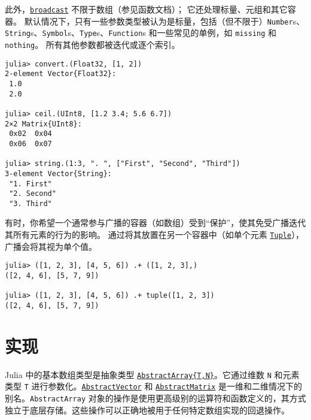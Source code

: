 此外，\hyperlink{616124539803111168}{\texttt{broadcast}} 不限于数组（参见函数文档）； 它还处理标量、元组和其它容器。 默认情况下，只有一些参数类型被认为是标量，包括（但不限于）\texttt{Number}s、\texttt{String}s、\texttt{Symbol}s、\texttt{Type}s、\texttt{Function}s 和一些常见的单例，如 \texttt{missing} 和\texttt{nothing}。 所有其他参数都被迭代或逐个索引。




\begin{verbatim}
julia> convert.(Float32, [1, 2])
2-element Vector{Float32}:
 1.0
 2.0

julia> ceil.(UInt8, [1.2 3.4; 5.6 6.7])
2×2 Matrix{UInt8}:
 0x02  0x04
 0x06  0x07

julia> string.(1:3, ". ", ["First", "Second", "Third"])
3-element Vector{String}:
 "1. First"
 "2. Second"
 "3. Third"
\end{verbatim}



有时，你希望一个通常参与广播的容器（如数组）受到“保护”，使其免受广播迭代其所有元素的行为的影响。 通过将其放置在另一个容器中（如单个元素 \hyperlink{17462354060312563026}{\texttt{Tuple}}），广播会将其视为单个值。




\begin{verbatim}
julia> ([1, 2, 3], [4, 5, 6]) .+ ([1, 2, 3],)
([2, 4, 6], [5, 7, 9])

julia> ([1, 2, 3], [4, 5, 6]) .+ tuple([1, 2, 3])
([2, 4, 6], [5, 7, 9])
\end{verbatim}



\hypertarget{2709595058891761459}{}


\section{实现}



Julia 中的基本数组类型是抽象类型 \hyperlink{6514416309183787338}{\texttt{AbstractArray\{T,N\}}}。它通过维数 \texttt{N} 和元素类型 \texttt{T} 进行参数化。\hyperlink{12517057979818647811}{\texttt{AbstractVector}} 和 \hyperlink{17966587371929951201}{\texttt{AbstractMatrix}} 是一维和二维情况下的别名。\texttt{AbstractArray} 对象的操作是使用更高级别的运算符和函数定义的，其方式独立于底层存储。这些操作可以正确地被用于任何特定数组实现的回退操作。



